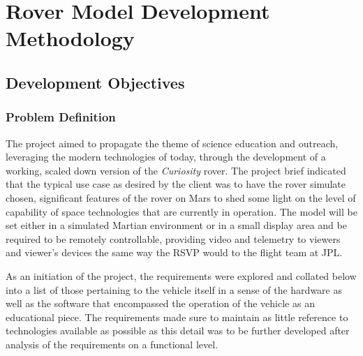 \chapter{Rover Model Development Methodology}
\section{Development Objectives}
  \subsection{Problem Definition}
  The project aimed to propagate the theme of science education and outreach, leveraging the modern technologies of today, through the development of a working, scaled down version of the \textit{Curiosity} rover. The project brief indicated that the typical use case as desired by the client was to have the rover simulate chosen, significant features of the rover on Mars to shed some light on the level of capability of space technologies that are currently in operation. The model will be set either in a simulated Martian environment or in a small display area and be required to be remotely controllable, providing video and telemetry to viewers and viewer's devices the same way the RSVP would to the flight team at JPL.
  
  As an initiation of the project, the requirements were explored and collated below into a list of those pertaining to the vehicle itself in a sense of the hardware as well as the software that encompassed the operation of the vehicle as an educational piece. The requirements made sure to maintain as little reference to technologies available as possible as this detail was to be further developed after analysis of the requirements on a functional level.
  
